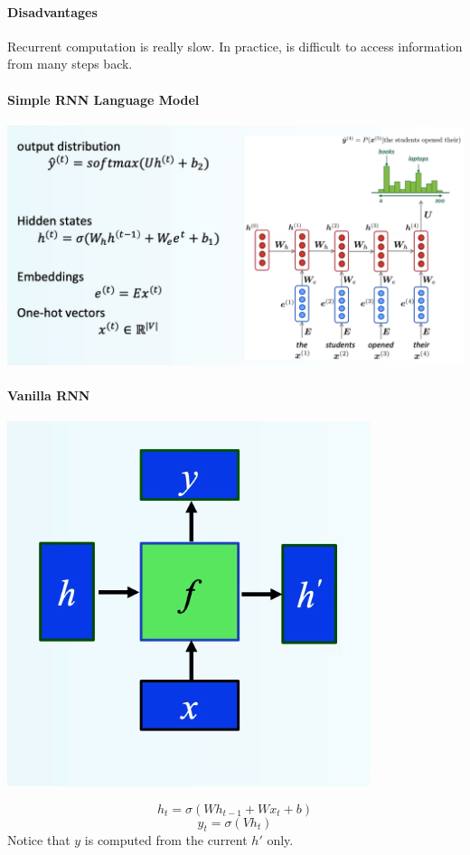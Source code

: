 \documentclass[10pt]{report}
\begin{document}
\paragraph{Disadvantages} Recurrent computation is really slow. In practice, is difficult to access information from many steps back.
\paragraph{Simple RNN Language Model}
\begin{center}
	\includegraphics[scale=0.5]{25.png}
\end{center}
\paragraph{Vanilla RNN}
\begin{center}
	\includegraphics[scale=0.5]{26.png}
\end{center}
$$h_t = \sigma\left(Wh_{t-1} + Wx_t + b\right)$$
$$y_t = \sigma\left(Vh_t\right)$$
Notice that $y$ is computed from the current $h'$ only.
\end{document}
